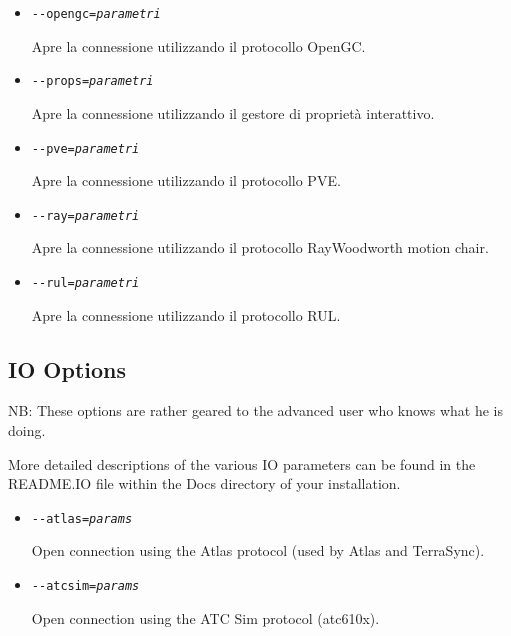 \begin{itemize}
{\begin{itemize}
    Apre la connessione utilizzando il protocollo NMEA.

  \item{\texttt{-$ $-opengc={\it parametri}}}

    Apre la connessione utilizzando il protocollo OpenGC.

  \item{\texttt{-$ $-props={\it parametri}}}

    Apre la connessione utilizzando il gestore di propriet\`{a} interattivo.

  \item{\texttt{-$ $-pve={\it parametri}}}

    Apre la connessione utilizzando il protocollo PVE.

  \item{\texttt{-$ $-ray={\it parametri}}}

    Apre la connessione utilizzando il protocollo RayWoodworth motion chair.

  \item{\texttt{-$ $-rul={\it parametri}}}

    Apre la connessione utilizzando il protocollo RUL.

  \end{itemize}
}
{
  \subsection{IO Options}

  NB: These options are rather geared to the advanced user who knows what he is doing.

  More detailed descriptions of the various IO parameters can be found in the README.IO file
  within the Docs directory of your \FlightGear{} installation.

  \begin{itemize}

  \item{\texttt{-$ $-atlas={\it params}}}

    Open connection using the Atlas protocol (used by Atlas and TerraSync).

  \item{\texttt{-$ $-atcsim={\it params}}}

    Open connection using the ATC Sim protocol (atc610x).


\end{itemize}}
\end{itemize}
